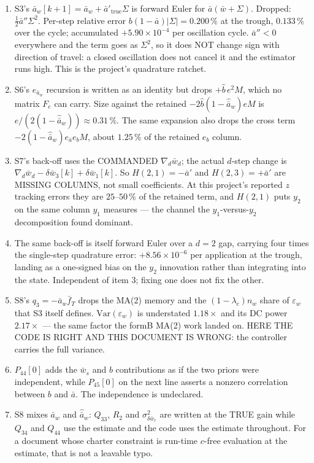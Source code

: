\documentclass[11pt,a4paper,fontset=none]{ctexart}
\newcommand{\ba}{\bar{a}}
\newcommand{\bw}{\bar{w}}
\begin{document}
\begin{enumerate}
\item S3's $\ba_w[k+1] = \ba_w + \ba'_{\mathrm{true}}\Sigma$ is forward Euler for
$\ba(\bw+\Sigma)$. Dropped: $\tfrac12\ba''\Sigma^{2}$. Per-step relative error
$b(1-\ba)|\Sigma| = 0.200\,\%$ at the trough, $0.133\,\%$ over the cycle;
accumulated $+5.90\times10^{-4}$ per oscillation cycle. $\ba'' < 0$ everywhere
and the term goes as $\Sigma^{2}$, so it does NOT change sign with direction of
travel: a closed oscillation does not cancel it and the estimator runs high.
This is the project's quadrature ratchet.

\item S6's $e_{\ba_w}$ recursion is written as an identity but drops
$+\hat{b}\,e^{2}M$, which no matrix $F_e$ can carry. Size against the retained
$-2\hat{b}(1-\hat{\ba}_w)eM$ is $e/(2(1-\hat{\ba}_w)) \approx 0.31\,\%$. The same
expansion also drops the cross term $-2(1-\hat{\ba}_w)e_{\ba}e_b M$, about
$1.25\,\%$ of the retained $e_b$ column.

\item S7's back-off uses the COMMANDED $\nabla_d\bw_d$; the actual $d$-step
change is $\nabla_d\bw_d - \delta\bw_3[k] + \delta\bw_1[k]$. So
$H(2,1) = -\ba'$ and $H(2,3) = +\ba'$ are MISSING COLUMNS, not small
coefficients. At this project's reported $z$ tracking errors they are
$25$--$50\,\%$ of the retained term, and $H(2,1)$ puts $y_2$ on the same column
$y_1$ measures --- the channel the $y_1$-versus-$y_2$ decomposition found
dominant.

\item The same back-off is itself forward Euler over a $d=2$ gap, carrying four
times the single-step quadrature error: $+8.56\times10^{-6}$ per application at
the trough, landing as a one-signed bias on the $y_2$ innovation rather than
integrating into the state. Independent of item 3; fixing one does not fix the
other.

\item S8's $q_3 = -\ba_w\bar{f}_T$ drops the MA(2) memory and the
$(1-\lambda_c)n_w$ share of $\varepsilon_w$ that S3 itself defines.
$\mathrm{Var}(\varepsilon_w)$ is understated $1.18\times$ and its DC power
$2.17\times$ --- the same factor the formB MA(2) work landed on. HERE THE CODE IS
RIGHT AND THIS DOCUMENT IS WRONG: the controller carries the full variance.

\item $P_{44}[0]$ adds the $\bw_s$ and $b$ contributions as if the two priors
were independent, while $P_{45}[0]$ on the next line asserts a nonzero
correlation between $b$ and $\ba$. The independence is undeclared.

\item S8 mixes $\ba_w$ and $\hat{\ba}_w$: $Q_{33}$, $R_2$ and
$\sigma^{2}_{\delta\bw_r}$ are written at the TRUE gain while $Q_{34}$ and
$Q_{44}$ use the estimate and the code uses the estimate throughout. For a
document whose charter constraint is run-time $c$-free evaluation at the
estimate, that is not a leavable typo.
\end{enumerate}
\end{document}
